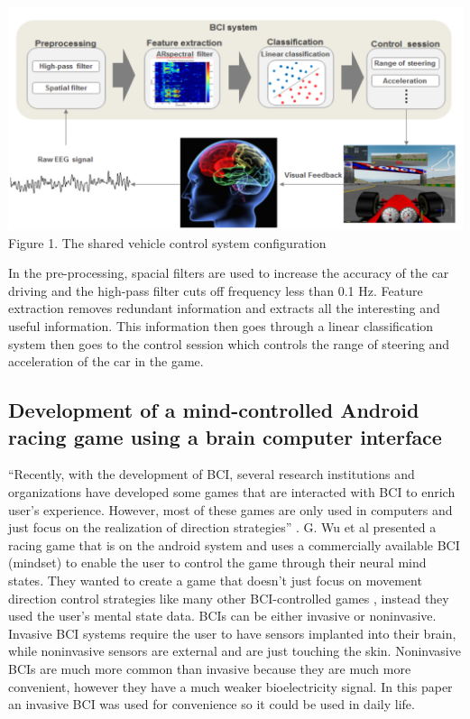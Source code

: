 \documentclass{scrartcl}
\begin{document}
\includegraphics[width=\textwidth]{TORCS_BCI}
Figure 1. The shared vehicle control system configuration \cite{SharedRacing}

In the pre-processing, spacial filters are used to increase the accuracy of the car driving and the high-pass filter cuts off frequency less than 0.1 Hz. Feature extraction removes redundant information and extracts all the interesting and useful information. This information then goes through a linear classification system then goes to the control session which controls the range of steering and acceleration of the car in the game. 


\subsection*{Development of a mind-controlled Android racing game using a brain computer interface}
``Recently, with the development of BCI, several research institutions and organizations have developed some games that are interacted with BCI to enrich user's experience. However, most of these games are only used in computers and just focus on the realization of direction strategies'' \cite{AndroidRacing}. G. Wu et al presented a racing game that is on the android system and uses a commercially available BCI (mindset) to enable the user to control the game through their neural mind states. They wanted to create a game that doesn't just focus on movement direction control strategies like many other BCI-controlled games \cite{GamingControlling}, instead they used the user's mental state data. BCIs can be either invasive or noninvasive. Invasive BCI systems require the user to have sensors implanted into their brain, while noninvasive sensors are external and are just touching the skin. Noninvasive BCIs are much more common than invasive because they are much more convenient, however they have a much weaker bioelectricity signal. In this paper an invasive BCI was used for convenience so it could be used in daily life.
\end{document}
